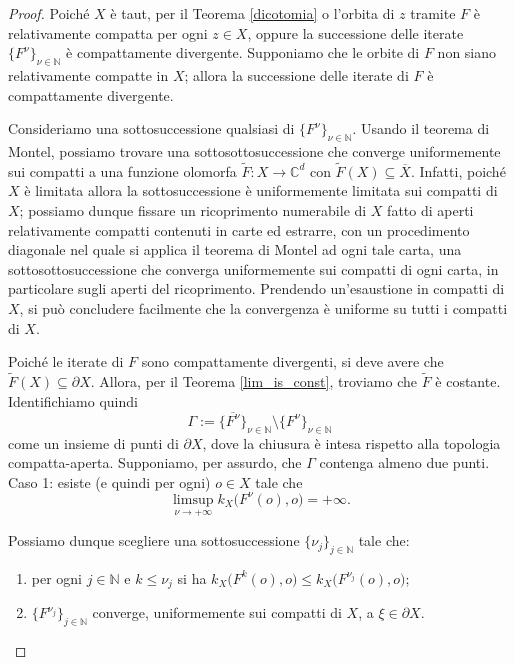 \begin{proof}
    Poiché $X$ è taut, per il Teorema \ref{dicotomia} o l'orbita di $z$ tramite $F$ è relativamente compatta per ogni $z \in X$, oppure la successione delle iterate $\{F^\nu\}_{\nu\in\mathbb{N}}$ è compattamente divergente. Supponiamo che le orbite di $F$ non siano relativamente compatte in $X$; allora la successione delle iterate di $F$ è compattamente divergente.

    Consideriamo una sottosuccessione qualsiasi di $\{F^\nu\}_{\nu\in\mathbb{N}}$. Usando il teorema di Montel, possiamo trovare una sottosottosuccessione che converge uniformemente sui compatti a una funzione olomorfa $\tilde{F}:X \rightarrow \mathbb{C}^d$ con $\tilde{F}(X)\subseteq\overline{X}$. Infatti, poiché $X$ è limitata allora la sottosuccessione è uniformemente limitata sui compatti di $X$; possiamo dunque fissare un ricoprimento numerabile di $X$ fatto di aperti relativamente compatti contenuti in carte ed estrarre, con un procedimento diagonale nel quale si applica il teorema di Montel ad ogni tale carta, una sottosottosuccessione che converga uniformemente sui compatti di ogni carta, in particolare sugli aperti del ricoprimento. Prendendo un'esaustione in compatti di $X$, si può concludere facilmente che la convergenza è uniforme su tutti i compatti di $X$.

    Poiché le iterate di $F$ sono compattamente divergenti, si deve avere che $\tilde{F}(X)\subseteq\partial X$. Allora, per il Teorema \ref{lim_is_const}, troviamo che $\tilde{F}$ è costante. Identifichiamo quindi
    $$\Gamma:=\overline{\{F^\nu\}}_{\nu\in\mathbb{N}}\setminus\{F^\nu\}_{\nu\in\mathbb{N}}$$
    come un insieme di punti di $\partial X$, dove la chiusura è intesa rispetto alla topologia compatta-aperta. Supponiamo, per assurdo, che $\Gamma$ contenga almeno due punti. \\

    Caso 1: esiste (e quindi per ogni) $o \in X$ tale che
    $$\limsup_{\nu\longrightarrow+\infty} k_X\big(F^\nu(o),o\big)=+\infty.$$

    Possiamo dunque scegliere una sottosuccessione $\{\nu_j\}_{j\in\mathbb{N}}$ tale che:
    \begin{enumerate}[label={(\arabic*)}]
        \item per ogni $j\in\mathbb{N}$ e $k\le\nu_j$ si ha $k_X\big(F^k(o),o\big) \le k_X\big(F^{\nu_j}(o),o\big)$;
        \item $\{F^{\nu_j}\}_{j\in\mathbb{N}}$ converge, uniformemente sui compatti di $X$, a $\xi\in\partial X$.
    \end{enumerate}


\end{proof}

